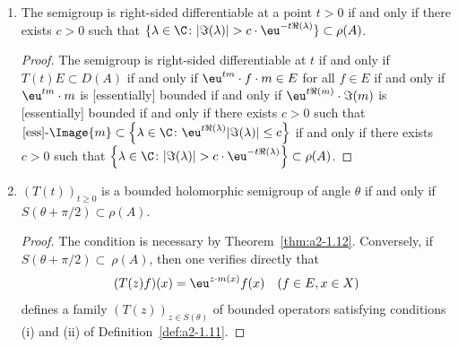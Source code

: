 \begin{example}
\begin{enumerate}[\upshape (i), wide, labelindent=.25em]
\begin{proof}
By hypothesis, the set 
$H \coloneqq \{m(x) \colon x \in X, \Re(m(x)) \geq b\}$ 
in the case $E = C_{0}(X)$ 
and $H \coloneqq \{m(x) \colon \Re(\lambda) \geq b \text{ and for all } \eta > 0, 
\mu(\{x \in X \colon |m(x)-\lambda| < \eta \}) \neq 0\}$
in the case $E = L^{p}$ 
is a bounded subset of\/ $\C$.
Thus $\lim_{t \to t'} |\eu^{tz} - \eu^{t'z}| = 0$ 
uniformly for $z \in H$.
Hence there exists $\delta \in \left]0,1\right]$ such that
\[
[\text{ess}]\text{-}\esssup\left\{\left|\eu^{tm(x)} - \eu^{t'm(x)}\right| \colon x \in X, \Re(m(x)) > b\right\} < \epsilon
\] 
whenever $|t-t'| < \delta$.
Together with the inequality above, we obtain that 
\[
\norm{T(t) - T(t')} = [\text{ess}]\text{-}\sup\left\{\left|\eu^{tm(x)} - \eu^{t'm(x)}\right| \colon x \in X\right\} < \epsilon
\]
whenever $|t-t'| < \delta$.
We have shown that the semigroup is norm continuous for $t > 0$ whenever $\{\lambda \in \sigma(A) \colon \Re(\lambda) \geq b\}$ is bounded for all $b \in \R$.
\end{proof}

\item \label{ex:a2-1.28-2}
The semigroup is right-sided differentiable at a point
$t > 0$ 
if and only if there exists $c > 0$ such that 
$\{\lambda \in \C \colon |\Im(\lambda)| > c \cdot \eu^{-t\Re(\lambda)}\} \subset \rho(A)$.

\begin{proof}
The semigroup is right-sided differentiable at $t$ 
if and only if\/ $T(t)E \subset D(A)$ 
if and only if\/ $\eu^{tm} \cdot f \cdot m \in E$ for all $f \in E$ 
if and only if\/ $\eu^{tm} \cdot m$ is [essentially] bounded 
if and only if\/ $\eu^{t\Re(m)} \cdot \Im(m)$ is [essentially] bounded 
if and only if there exists $c > 0$ such that 
$[\text{ess}]\text{-}\Image{m} \subset 
\left\{\lambda \in \C \colon \eu^{t\Re(\lambda)}|\Im(\lambda)| \leq c\right\}$ 
if and only if there exists $c > 0$ such that 
$\left\{\lambda \in \C \colon |\Im(\lambda)| > c \cdot \eu^{-t\Re(\lambda)}\right\} \subset \rho(A)$.
\end{proof}

\item \label{ex:a2-1.28-3}
$(T(t))_{t \geq 0}$ is a bounded holomorphic semigroup of angle $\theta$ if and only if 
$S(\theta + \pi/2) \subset \rho(A)$.

\begin{proof}
The condition is necessary by Theorem~\ref{thm:a2-1.12}.
Conversely, if\/ $S(\theta + \pi/2) \subset~\rho(A)$, then one verifies directly that 
\[
(T(z)f)(x) = \eu^{z \cdot m(x)}f(x) \quad (f \in E, x \in X) 
\]
defines a family $(T(z))_{z \in S(\theta)}$ of bounded operators satisfying conditions (i) and (ii)
of Definition~\ref{def:a2-1.11}.
\end{proof}


\end{enumerate}
\end{example}
